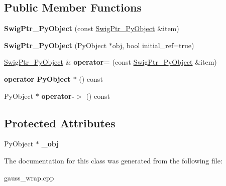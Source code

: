 \subsection*{Public Member Functions}
\begin{DoxyCompactItemize}
\item 
\hypertarget{classswig_1_1_swig_ptr___py_object_a4282f20207f8cd22c9b079203c832a04}{{\bfseries Swig\-Ptr\-\_\-\-Py\-Object} (const \hyperlink{classswig_1_1_swig_ptr___py_object}{Swig\-Ptr\-\_\-\-Py\-Object} \&item)}\label{classswig_1_1_swig_ptr___py_object_a4282f20207f8cd22c9b079203c832a04}

\item 
\hypertarget{classswig_1_1_swig_ptr___py_object_a4503d58d577d209f5e1fa67026852505}{{\bfseries Swig\-Ptr\-\_\-\-Py\-Object} (Py\-Object $\ast$obj, bool initial\-\_\-ref=true)}\label{classswig_1_1_swig_ptr___py_object_a4503d58d577d209f5e1fa67026852505}

\item 
\hypertarget{classswig_1_1_swig_ptr___py_object_a86d8657d6b4a27c8e9e6942bc1ba572c}{\hyperlink{classswig_1_1_swig_ptr___py_object}{Swig\-Ptr\-\_\-\-Py\-Object} \& {\bfseries operator=} (const \hyperlink{classswig_1_1_swig_ptr___py_object}{Swig\-Ptr\-\_\-\-Py\-Object} \&item)}\label{classswig_1_1_swig_ptr___py_object_a86d8657d6b4a27c8e9e6942bc1ba572c}

\item 
\hypertarget{classswig_1_1_swig_ptr___py_object_aa2f1cdba0651c7a52482d225faef0574}{{\bfseries operator Py\-Object $\ast$} () const }\label{classswig_1_1_swig_ptr___py_object_aa2f1cdba0651c7a52482d225faef0574}

\item 
\hypertarget{classswig_1_1_swig_ptr___py_object_a97a20cad6a2b0916f39c45555fb559f0}{Py\-Object $\ast$ {\bfseries operator-\/$>$} () const }\label{classswig_1_1_swig_ptr___py_object_a97a20cad6a2b0916f39c45555fb559f0}

\end{DoxyCompactItemize}
\subsection*{Protected Attributes}
\begin{DoxyCompactItemize}
\item 
\hypertarget{classswig_1_1_swig_ptr___py_object_ae617c5726496db423cd19688e3264618}{Py\-Object $\ast$ {\bfseries \-\_\-obj}}\label{classswig_1_1_swig_ptr___py_object_ae617c5726496db423cd19688e3264618}

\end{DoxyCompactItemize}


The documentation for this class was generated from the following file\-:\begin{DoxyCompactItemize}
\item 
gauss\-\_\-wrap.\-cpp\end{DoxyCompactItemize}
